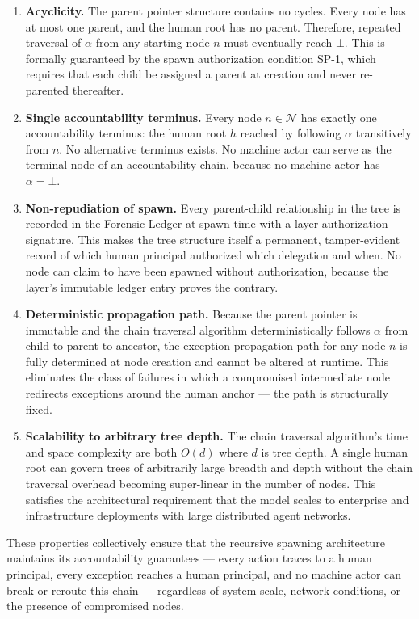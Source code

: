 \begin{enumerate}
\item[$\mathbf{P_1}$] \textbf{Acyclicity.} The parent pointer structure contains no cycles. Every node has at most one parent, and the human root has no parent. Therefore, repeated traversal of $\alpha$ from any starting node $n$ must eventually reach $\bot$. This is formally guaranteed by the spawn authorization condition SP-1, which requires that each child be assigned a parent at creation and never re-parented thereafter.

\item[$\mathbf{P_2}$] \textbf{Single accountability terminus.} Every node $n \in \mathcal{N}$ has exactly one accountability terminus: the human root $h$ reached by following $\alpha$ transitively from $n$. No alternative terminus exists. No machine actor can serve as the terminal node of an accountability chain, because no machine actor has $\alpha = \bot$.

\item[$\mathbf{P_3}$] \textbf{Non-repudiation of spawn.} Every parent-child relationship in the tree is recorded in the Forensic Ledger at spawn time with a \purpose{} layer authorization signature. This makes the tree structure itself a permanent, tamper-evident record of which human principal authorized which delegation and when. No node can claim to have been spawned without authorization, because the \fact{} layer's immutable ledger entry proves the contrary.

\item[$\mathbf{P_4}$] \textbf{Deterministic propagation path.} Because the parent pointer is immutable and the chain traversal algorithm deterministically follows $\alpha$ from child to parent to ancestor, the exception propagation path for any node $n$ is fully determined at node creation and cannot be altered at runtime. This eliminates the class of failures in which a compromised intermediate node redirects exceptions around the human anchor — the path is structurally fixed.

\item[$\mathbf{P_5}$] \textbf{Scalability to arbitrary tree depth.} The chain traversal algorithm's time and space complexity are both $O(d)$ where $d$ is tree depth. A single human root can govern trees of arbitrarily large breadth and depth without the chain traversal overhead becoming super-linear in the number of nodes. This satisfies the architectural requirement that the \bxthree{} model scales to enterprise and infrastructure deployments with large distributed agent networks.
\end{enumerate}

These properties collectively ensure that the \bxthree{} recursive spawning architecture maintains its accountability guarantees — every action traces to a human principal, every exception reaches a human principal, and no machine actor can break or reroute this chain — regardless of system scale, network conditions, or the presence of compromised nodes.
